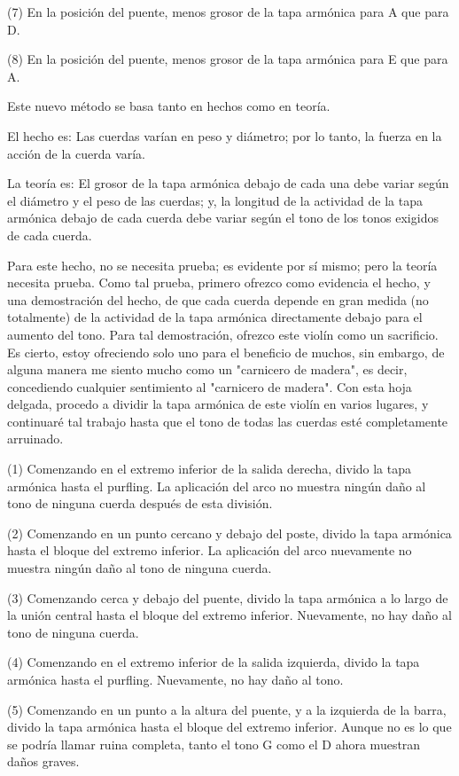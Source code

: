 \documentclass[12pt]{book}
\begin{document}
(7) En la posición del puente, menos grosor de la tapa armónica para A que para D.

(8) En la posición del puente, menos grosor de la tapa armónica para E que para A.

Este nuevo método se basa tanto en hechos como en teoría.

El hecho es: Las cuerdas varían en peso y diámetro; por lo tanto, la fuerza en la acción de la cuerda varía.

La teoría es: El grosor de la tapa armónica debajo de cada una debe variar según el diámetro y el peso de las cuerdas; y, la longitud de la actividad de la tapa armónica debajo de cada cuerda debe variar según el tono de los tonos exigidos de cada cuerda.

Para este hecho, no se necesita prueba; es evidente por sí mismo; pero la teoría necesita prueba. Como tal prueba, primero ofrezco como evidencia el hecho, y una demostración del hecho, de que cada cuerda depende en gran medida (no totalmente) de la actividad de la tapa armónica directamente debajo para el aumento del tono. Para tal demostración, ofrezco este violín como un sacrificio. Es cierto, estoy ofreciendo solo uno para el beneficio de muchos, sin embargo, de alguna manera me siento mucho como un "carnicero de madera", es decir, concediendo cualquier sentimiento al "carnicero de madera". Con esta hoja delgada, procedo a dividir la tapa armónica de este violín en varios lugares, y continuaré tal trabajo hasta que el tono de todas las cuerdas esté completamente arruinado.

(1) Comenzando en el extremo inferior de la salida derecha, divido la tapa armónica hasta el purfling. La aplicación del arco no muestra ningún daño al tono de ninguna cuerda después de esta división.

(2) Comenzando en un punto cercano y debajo del poste, divido la tapa armónica hasta el bloque del extremo inferior. La aplicación del arco nuevamente no muestra ningún daño al tono de ninguna cuerda.

(3) Comenzando cerca y debajo del puente, divido la tapa armónica a lo largo de la unión central hasta el bloque del extremo inferior. Nuevamente, no hay daño al tono de ninguna cuerda.

(4) Comenzando en el extremo inferior de la salida izquierda, divido la tapa armónica hasta el purfling. Nuevamente, no hay daño al tono.

(5) Comenzando en un punto a la altura del puente, y a la izquierda de la barra, divido la tapa armónica hasta el bloque del extremo inferior. Aunque no es lo que se podría llamar ruina completa, tanto el tono G como el D ahora muestran daños graves.
\end{document}
